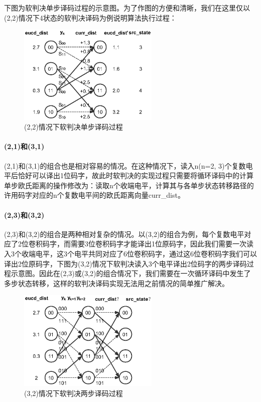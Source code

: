 下图为软判决单步译码过程的示意图。为了作图的方便和清晰，我们在这里仅以(2,2)情况下4状态的软判决译码为例说明算法执行过程：

\begin{figure}[h]
    \centering
    \includegraphics[width=0.6\textwidth,trim=0 40 0 40,clip]{pic/2-3-1.eps}
    \caption{(2,2)情况下软判决单步译码过程}
\end{figure}

\paragraph{(2,1)和(3,1)}
\indent

(2,1)和(3,1)的组合也是相对容易的情况。在这种情况下，读入n(n=2, 3)个复数电平后恰好可以译出1位码字，故此时软判决的实现过程只需要将循环译码中的计算单步欧氏距离的操作修改为：读取n个收端电平，计算其与各单步状态转移路径的许用码字对应的n个复数电平间的欧氏距离向量curr\_dist。

\paragraph{(2,3)和(3,2)}
\indent

(2,3)和(3,2)的组合是两种相对复杂的情况。以(3,2)的组合为例，每个复数电平对应了2位卷积码字，而需要3位卷积码字才能译出1位原码字，因此我们需要一次读入3个收端电平，这3个电平共同对应了6位卷积码字，通过这6位卷积码字我们可以译出2位原码字，下图为(3,2)情况下软判决读入3个电平译出2位码字的两步译码过程示意图。因此在(2,3)或(3,2)的组合情况下，我们需要在一次循环译码中发生了多步状态转移，这样的软判决译码实现无法用之前情况的简单推广解决。

\begin{figure}[h]
    \centering
    \includegraphics[width=0.6\textwidth,trim=0 40 0 40,clip]{pic/2-3-2.eps}
    \caption{(3,2)情况下软判决两步译码过程}
\end{figure}


